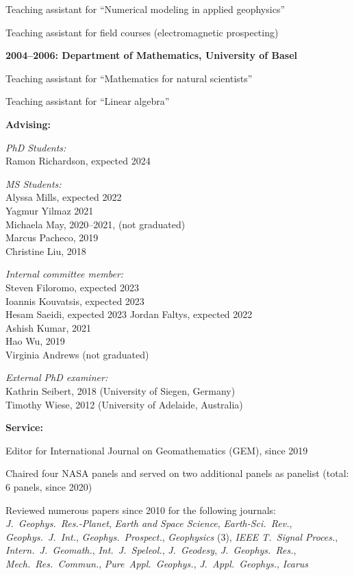 \documentclass[10pt]{article}
\begin{document}
Teaching assistant for ``Numerical modeling in applied geophysics''
     
Teaching assistant for field courses (electromagnetic prospecting)

\spcp
\textbf{2004--2006: Department of Mathematics, University of Basel}

Teaching assistant for ``Mathematics for natural scientists''

Teaching assistant for ``Linear algebra''


\spc
\textbf{\tsize Advising:}

\spcp
\emph{PhD Students:}\\
Ramon Richardson, expected 2024 

\spcp
\emph{MS Students:}\\
Alyssa Mills, expected 2022 \\
Yagmur Yilmaz 2021 \\
Michaela May, 2020--2021, (not graduated) \\
Marcus Pacheco, 2019 \\
Christine Liu, 2018 

\spcp
\emph{Internal committee member:}\\
Steven Filoromo, expected 2023\\
Ioannis Kouvatsis, expected 2023\\
Hesam Saeidi, expected 2023
Jordan Faltys, expected 2022 \\
Ashish Kumar, 2021\\
Hao Wu, 2019\\
Virginia Andrews (not graduated)

\spcp
\emph{External PhD examiner:}\\
Kathrin Seibert, 2018 (University of Siegen, Germany)\\
Timothy Wiese, 2012 (University of Adelaide, Australia)




\spc
\textbf{\tsize Service:}

\spcp
Editor for International Journal on Geomathematics (GEM), since 2019

\spcp
Chaired four NASA panels and served on two
additional panels as panelist (total: 6 panels, since 2020)

\spcp
Reviewed numerous papers since 2010 for the following journals:\\
\emph{J.~Geophys.~Res.-Planet},
\emph{Earth and Space Science},
\emph{Earth-Sci.~Rev.},
\emph{Geophys.~J.~Int.},
\emph{Geophys.~Prospect.},
\emph{Geophysics} (3),
\emph{IEEE T.~Signal Proces.},
\emph{Intern.~J.~Geomath.},
\emph{Int.~J.~Speleol.},
\emph{J.~Geodesy},
\emph{J.~Geophys.~Res.},
\emph{Mech.~Res.~Commun.},
\emph{Pure~Appl.~Geophys.},
\emph{J.~Appl.~Geophys.},
\emph{Icarus}
\end{document}
